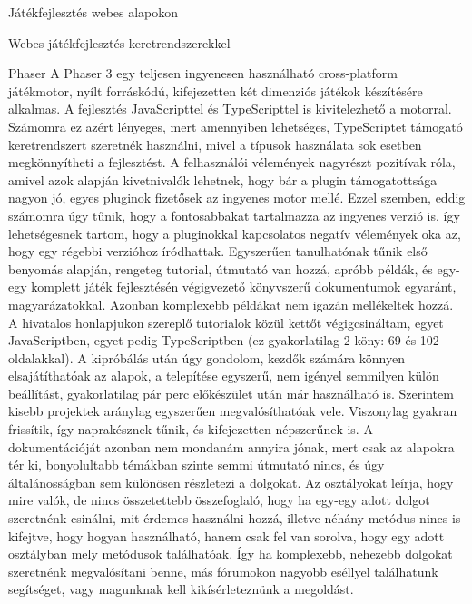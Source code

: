 \begin{MyChapter}{Játékfejlesztés webes alapokon}
\begin{MySection}{Webes játékfejlesztés keretrendszerekkel}
		\begin{MySubSection}{Phaser}
			A Phaser 3 egy teljesen ingyenesen használható cross-platform játékmotor, nyílt forráskódú, kifejezetten két dimenziós játékok készítésére alkalmas. A fejlesztés JavaScripttel és TypeScripttel is kivitelezhető a motorral. Számomra ez azért lényeges, mert amennyiben lehetséges, TypeScriptet támogató keretrendszert szeretnék használni, mivel a típusok használata sok esetben megkönnyítheti a fejlesztést.
			A felhasználói vélemények nagyrészt pozitívak róla, amivel azok alapján kivetnivalók lehetnek, hogy bár a plugin támogatottsága nagyon jó, egyes pluginok fizetősek az ingyenes motor mellé. Ezzel szemben, eddig számomra úgy tűnik, hogy a fontosabbakat tartalmazza az ingyenes verzió is, így lehetségesnek tartom, hogy a pluginokkal kapcsolatos negatív vélemények oka az, hogy egy régebbi verzióhoz íródhattak.
			Egyszerűen tanulhatónak tűnik első benyomás alapján, rengeteg tutorial, útmutató van hozzá, apróbb példák, és egy-egy komplett játék fejlesztésén végigvezető könyvszerű dokumentumok egyaránt, magyarázatokkal. Azonban komplexebb példákat nem igazán mellékeltek hozzá.
			A hivatalos honlapjukon szereplő tutorialok közül kettőt végigcsináltam, egyet JavaScriptben, egyet pedig TypeScriptben (ez gyakorlatilag 2 köny: 69 és 102 oldalakkal). 
			A kipróbálás után úgy gondolom, kezdők számára könnyen elsajátíthatóak az alapok, a telepítése egyszerű, nem igényel semmilyen külön beállítást, gyakorlatilag pár perc előkészület után már használható is.
			Szerintem kisebb projektek aránylag egyszerűen megvalósíthatóak vele.
			Viszonylag gyakran frissítik, így naprakésznek tűnik, és kifejezetten népszerűnek is.
			A dokumentációját azonban nem mondanám annyira jónak, mert csak az alapokra tér ki, bonyolultabb témákban szinte semmi útmutató nincs, és úgy általánosságban sem különösen részletezi a dolgokat. Az osztályokat leírja, hogy mire valók, de nincs összetettebb összefoglaló, hogy ha egy-egy adott dolgot szeretnénk csinálni, mit érdemes használni hozzá, illetve néhány metódus nincs is kifejtve, hogy hogyan használható, hanem csak fel van sorolva, hogy egy adott osztályban mely metódusok találhatóak. Így ha komplexebb, nehezebb dolgokat szeretnénk megvalósítani benne, más fórumokon nagyobb eséllyel találhatunk segítséget, vagy magunknak kell kikísérleteznünk a megoldást.
		\end{MySubSection}
			

\end{MySection}
\end{MyChapter}
